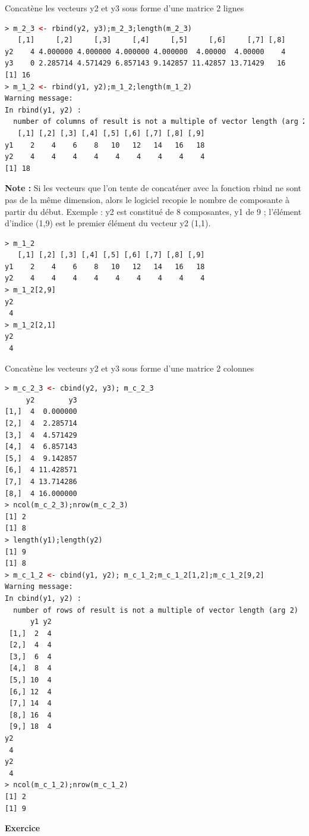 Concatène les vecteurs y2 et y3 sous forme d'une matrice 2 lignes
\begin{lstlisting}[language=html]
> m_2_3 <- rbind(y2, y3);m_2_3;length(m_2_3)
   [,1]     [,2]     [,3]     [,4]     [,5]     [,6]     [,7] [,8]
y2    4 4.000000 4.000000 4.000000 4.000000  4.00000  4.00000    4
y3    0 2.285714 4.571429 6.857143 9.142857 11.42857 13.71429   16
[1] 16
> m_1_2 <- rbind(y1, y2);m_1_2;length(m_1_2)
Warning message:
In rbind(y1, y2) :
  number of columns of result is not a multiple of vector length (arg 2)
   [,1] [,2] [,3] [,4] [,5] [,6] [,7] [,8] [,9]
y1    2    4    6    8   10   12   14   16   18
y2    4    4    4    4    4    4    4    4    4
[1] 18
\end{lstlisting}
\textbf{Note :} Si les vecteurs que l'on tente de concaténer avec la fonction rbind ne sont pas de la même dimension, alors le logiciel recopie le nombre de composante à partir du début. Exemple : y2 est constitué de 8 composantes, y1 de 9 ; l'élément d'indice (1,9) est le premier élément du vecteur y2 (1,1).
\begin{lstlisting}[language=html]
> m_1_2
   [,1] [,2] [,3] [,4] [,5] [,6] [,7] [,8] [,9]
y1    2    4    6    8   10   12   14   16   18
y2    4    4    4    4    4    4    4    4    4
> m_1_2[2,9]
y2 
 4 
> m_1_2[2,1]
y2 
 4 
\end{lstlisting}
Concatène les vecteurs y2 et y3 sous forme d'une matrice 2 colonnes
\begin{lstlisting}[language=html]
> m_c_2_3 <- cbind(y2, y3); m_c_2_3
     y2        y3
[1,]  4  0.000000
[2,]  4  2.285714
[3,]  4  4.571429
[4,]  4  6.857143
[5,]  4  9.142857
[6,]  4 11.428571
[7,]  4 13.714286
[8,]  4 16.000000
> ncol(m_c_2_3);nrow(m_c_2_3)
[1] 2
[1] 8
> length(y1);length(y2)
[1] 9
[1] 8
> m_c_1_2 <- cbind(y1, y2); m_c_1_2;m_c_1_2[1,2];m_c_1_2[9,2]
Warning message:
In cbind(y1, y2) :
  number of rows of result is not a multiple of vector length (arg 2)
      y1 y2
 [1,]  2  4
 [2,]  4  4
 [3,]  6  4
 [4,]  8  4
 [5,] 10  4
 [6,] 12  4
 [7,] 14  4
 [8,] 16  4
 [9,] 18  4
y2 
 4 
y2 
 4 
> ncol(m_c_1_2);nrow(m_c_1_2)
[1] 2
[1] 9
\end{lstlisting}
\textbf{Exercice}\newline
\\

